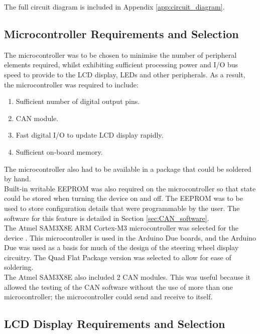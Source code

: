 \documentclass[a4paper,12pt]{article}
\begin{document}
The full circuit diagram is included in Appendix \ref{app:circuit_diagram}.

\subsection{Microcontroller Requirements and Selection}
\label{sec:microcontroller}

The microcontroller was to be chosen to minimise the number of peripheral elements required, whilst exhibiting sufficient processing power and I/O bus speed to provide to the LCD display, LEDs and other peripherals. As a result, the microcontroller was required to include:

\begin{enumerate}
  \item Sufficient number of digital output pins.
  \item CAN module.
  \item Fast digital I/O to update LCD display rapidly.
  \item Sufficient on-board memory.
\end{enumerate}

The microcontroller also had to be available in a package that could be soldered by hand. \\

Built-in writable EEPROM was also required on the microcontroller so that state could be stored when turning the device on and off. The EEPROM was to be used to store configuration details that were programmable by the user. The software for this feature is detailed in Section \ref{sec:CAN_software}. \\

The Atmel SAM3X8E ARM Cortex-M3 microcontroller was selected for the device \cite{microcontroller}. This microcontroller is used in the Arduino Due boards, and the Arduino Due was used as a basis for much of the design of the steering wheel display circuitry. The Quad Flat Package version was selected to allow for ease of soldering. \\

The Atmel SAM3X8E also included 2 CAN modules. This was useful because it allowed the testing of the CAN software without the use of more than one microcontroller; the microcontroller could send and receive to itself. \\

\subsection{LCD Display Requirements and Selection}
\label{sec:display}
\end{document}
